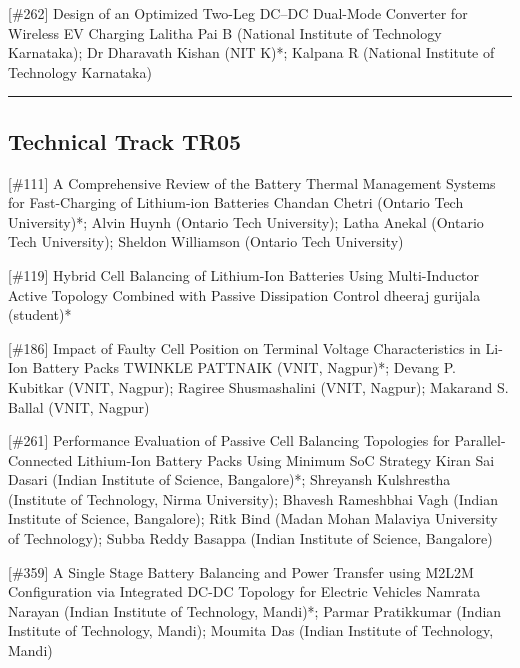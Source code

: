 {} \begin{abstract_online} {[\#262] Design of an Optimized Two-Leg DC–DC Dual-Mode Converter for Wireless EV Charging} {} {Lalitha Pai B (National Institute of Technology Karnataka); Dr Dharavath  Kishan (NIT K)*; Kalpana R (National Institute of Technology Karnataka)} {}  \end{abstract_online} 
\hrule  \subsection{Technical Track TR05}\nopagebreak {} \begin{abstract_online} {[\#111] A Comprehensive Review of the Battery Thermal Management Systems for Fast-Charging of Lithium-ion Batteries} {} {Chandan Chetri (Ontario Tech University)*; Alvin Huynh (Ontario Tech University); Latha Anekal (Ontario Tech University); Sheldon Williamson (Ontario Tech University)} {}  \end{abstract_online} 
{} \begin{abstract_online} {[\#119] Hybrid Cell Balancing of Lithium-Ion Batteries Using Multi-Inductor Active Topology Combined with Passive Dissipation Control} {} {dheeraj gurijala (student)*} {}  \end{abstract_online} 
{} \begin{abstract_online} {[\#186] Impact of Faulty Cell Position on Terminal Voltage Characteristics in Li-Ion Battery Packs} {} {TWINKLE  PATTNAIK (VNIT, Nagpur)*; Devang P. Kubitkar (VNIT, Nagpur); Ragiree Shusmashalini (VNIT, Nagpur); Makarand S. Ballal (VNIT, Nagpur)} {}  \end{abstract_online} 
{} \begin{abstract_online} {[\#261] Performance Evaluation of Passive Cell Balancing Topologies for Parallel-Connected Lithium-Ion Battery Packs Using Minimum SoC Strategy } {} {Kiran Sai Dasari (Indian Institute of Science, Bangalore)*; Shreyansh  Kulshrestha (Institute of Technology, Nirma University); Bhavesh Rameshbhai Vagh  (Indian Institute of Science, Bangalore); Ritk  Bind  (Madan Mohan Malaviya University of Technology); Subba Reddy Basappa (Indian Institute of Science, Bangalore)} {}  \end{abstract_online} 
{} \begin{abstract_online} {[\#359] A Single Stage Battery Balancing and Power Transfer using M2L2M Configuration via Integrated DC-DC Topology for Electric Vehicles} {} {Namrata Narayan (Indian Institute of Technology, Mandi)*; Parmar  Pratikkumar (Indian Institute of Technology, Mandi); Moumita Das (Indian Institute of Technology, Mandi)} {}  \end{abstract_online} 
